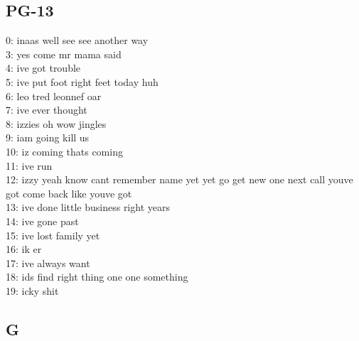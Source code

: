 \documentclass[a4paper]{article}
\begin{document}
\subsection*{PG-13}

\begin{center}
    0:  inaas well see see another way\\
    3:  yes come mr mama said\\
    4:  ive got trouble\\
    5:  ive put foot right feet today huh\\
    6:  leo tred leonnef oar\\
    7:  ive ever thought\\
    8:  izzies oh wow jingles\\
    9:  iam going kill us\\
    10:  iz coming thats coming\\
    11:  ive run\\
    12:  izzy yeah know cant remember name yet yet go get new one next call youve got come back like youve got\\
    13:  ive done little business right years\\
    14:  ive gone past\\
    15:  ive lost family yet\\
    16:  ik er\\
    17:  ive always want\\
    18:  ids find right thing one one something\\
    19:  icky shit\\
\end{center}

\subsection*{G}
\end{document}
